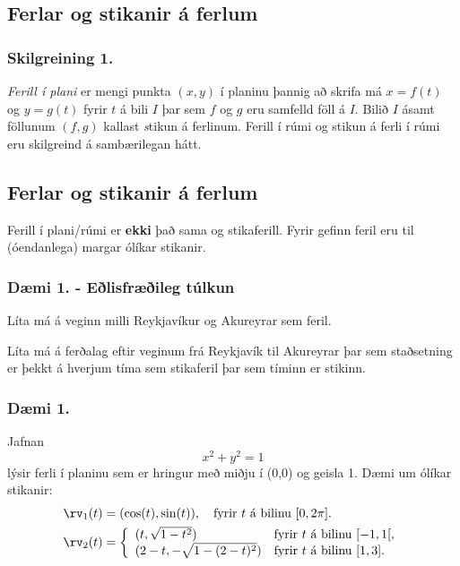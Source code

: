 \subsection{Ferlar og stikanir á ferlum}
\subsubsection{Skilgreining 1.}
{\em Ferill í plani} er mengi punkta $(x,y)$ í planinu þannig að skrifa má $x=f(t)$ og $y=g(t)$ fyrir $t$ á bili $I$ þar sem $f$ og $g$ eru samfelld föll á $I$. Bilið $I$ ásamt föllunum $(f,g)$ kallast {\emph stikun} á ferlinum. Ferill í rúmi og stikun á ferli í rúmi eru skilgreind á sambærilegan hátt.



\subsection {Ferlar og stikanir á ferlum}
Ferill í plani/rúmi er \textbf{ekki} það sama og stikaferill. Fyrir gefinn feril eru til (óendanlega) margar ólíkar stikanir.
\pause
\subsubsection{Dæmi 1. - Eðlisfræðileg túlkun}
Líta má á veginn milli Reykjavíkur og Akureyrar sem feril.

Líta má á ferðalag eftir veginum frá Reykjavík til Akureyrar þar sem staðsetning er þekkt á hverjum tíma sem stikaferil þar sem tíminn er stikinn.

\pause
\subsubsection{Dæmi 1.}
Jafnan
$$x^2+y^2 = 1$$
lýsir ferli í planinu sem er hringur með miðju í (0,0) og geisla 1. Dæmi um ólíkar stikanir:
\begin{align*}
\rv_1(t) &= (\cos(t),\sin(t)), \quad \text{fyrir $t$ á bilinu $[0,2\pi].$} \\
\rv_2(t) &= \left\{\begin{array}{ll}
(t,\sqrt{1-t^2}) & \text{fyrir $t$ á bilinu $[-1,1[,$} \\
(2-t,-\sqrt{1-(2-t)^2}) & \text{fyrir $t$ á bilinu $[1,3].$} 
\end{array}\right.
\end{align*}






